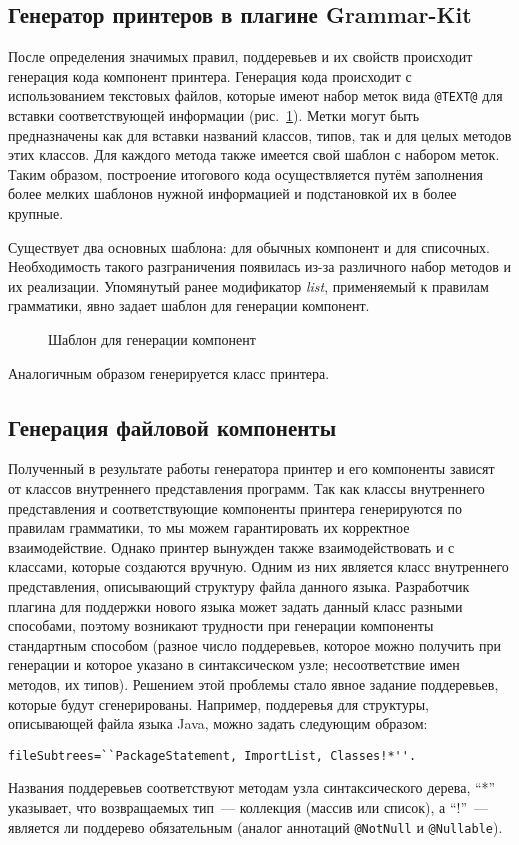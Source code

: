 \subsection{Генератор принтеров в плагине Grammar-Kit}
После определения значимых правил, поддеревьев и их свойств происходит генерация кода компонент принтера.
Генерация кода происходит с использованием текстовых файлов, которые имеют набор меток вида \lstinline{@TEXT@} для вставки соответствующей информации (рис.~\ref{impl:templateFile}).
Метки могут быть предназначены как для вставки названий классов, типов, так и для целых методов этих классов.
Для каждого метода также имеется свой шаблон с набором меток.
Таким образом, построение итогового кода осуществляется путём заполнения более мелких шаблонов нужной информацией и подстановкой их в более крупные.

Существует два основных шаблона: для обычных компонент и для списочных.
Необходимость такого разграничения появилась из-за различного набор методов и их реализации.
Упомянутый ранее модификатор \emph{list}, применяемый к правилам грамматики, явно задает шаблон для генерации компонент.
\begin{figure}[h]
    \centering
 	
 	\caption{Шаблон для генерации компонент}
    \label{impl:templateFile}
\end{figure}
Аналогичным образом генерируется класс принтера.

\subsection{Генерация файловой компоненты}
Полученный в результате работы генератора принтер и его компоненты зависят от классов внутреннего представления программ.
Так как классы внутреннего представления и соответствующие компоненты принтера генерируются по правилам грамматики, то мы можем гарантировать их корректное взаимодействие.
Однако принтер вынужден также взаимодействовать и с классами, которые создаются вручную.
Одним из них является класс внутреннего представления, описывающий структуру файла данного языка.
Разработчик плагина для поддержки нового языка может задать данный класс разными способами, поэтому возникают трудности при генерации компоненты стандартным способом (разное число поддеревьев, которое можно получить при генерации и которое указано в синтаксическом узле; несоответствие имен методов, их типов).
Решением этой проблемы стало явное задание поддеревьев, которые будут сгенерированы.
Например, поддеревья для структуры, описывающей файла языка Java, можно задать следующим образом:
{
\begin{lstlisting}
fileSubtrees=``PackageStatement, ImportList, Classes!*''.
\end{lstlisting}
}
\noindent
Названия поддеревьев соответствуют методам узла синтаксического дерева, ``*'' указывает, что возвращаемых тип~--- коллекция (массив или список), а ``!''~---  является ли поддерево обязательным (аналог аннотаций \lstinline{@NotNull} и \lstinline{@Nullable}). 

